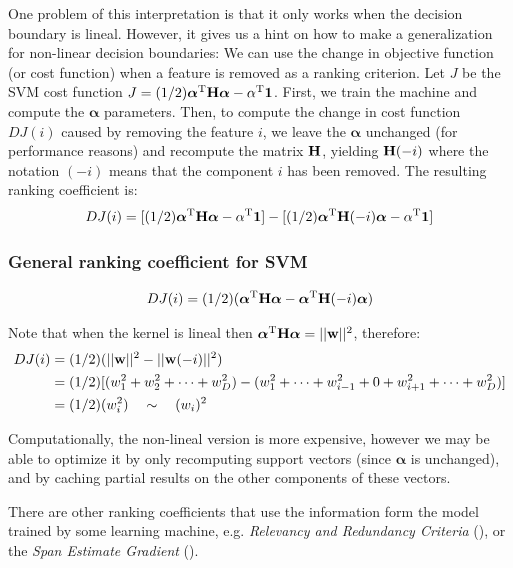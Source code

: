 One problem of this interpretation is that it only works when the decision bound\-ary is lineal. However, it gives us a hint on how to make a generalization for non-linear decision boundaries: We can use the change in objective function (or cost function) when a feature is removed as a ranking criterion. Let $J$ be the SVM cost function $J = (1/2) \boldsymbol{\alpha}^{\text{T}} \mathbf{H} \boldsymbol{\alpha} - \alpha^{\text{T}} \mathbf{1}$. First, we train the machine and compute the $\boldsymbol{\alpha}$ parameters. Then, to compute the change in cost function $DJ(i)$ caused by removing the feature $i$, we leave the $\boldsymbol{\alpha}$ unchanged (for performance reasons) and recompute the matrix $\mathbf{H}$, yielding $\mathbf{H}(-i)$ where the notation $(-i)$ means that the component $i$ has been removed. The resulting ranking coefficient is:
\begin{align*}
    DJ(i) = [(1/2) \boldsymbol{\alpha}^{\text{T}} \mathbf{H} \boldsymbol{\alpha} - \alpha^{\text{T}} \mathbf{1}]
     - [(1/2) \boldsymbol{\alpha}^{\text{T}} \mathbf{H}(-i) \boldsymbol{\alpha} - \alpha^{\text{T}} \mathbf{1}]
\end{align*}

\subsubsection*{General ranking coefficient for SVM}
\label{eq:ch4.grankingcoeff}
\begin{align}
    DJ(i) = (1/2)(\boldsymbol{\alpha}^{\text{T}} \mathbf{H} \boldsymbol{\alpha} - \boldsymbol{\alpha}^{\text{T}} \mathbf{H}(-i) \boldsymbol{\alpha})
\end{align}

Note that when the kernel is lineal then $\boldsymbol{\alpha}^{\text{T}} \mathbf{H} \boldsymbol{\alpha} = ||\mathbf{w}||^2$, therefore:
\begin{align*}
    DJ(i) &= (1/2)(||\mathbf{w}||^2 - ||\mathbf{w}(-i)||^2) \\
          &= (1/2)[(w_1^2 + w_2^2 + \dots + w_D^2) - (w_1^2 + \dots + w_{i-1}^2 + 0 + w_{i+1}^2 + \dots + w_D^2)] \\
          &= (1/2)(w_i^2) \quad \sim \quad (w_i)^2
\end{align*} 

Computationally, the non-lineal version is more expensive, however we may be able to optimize it by only recomputing support vectors (since $\boldsymbol{\alpha}$ is unchanged), and by caching partial results on the other components of these vectors.

\begin{sloppypar}
There are other ranking coefficients that use the information form the model trained by some learning machine, e.g. \emph{Relevancy and Redundancy Criteria} (\cite{mundra_svm-rfe_2007}), or the \emph{Span Estimate Gradient} (\cite{rakotomamonjy_variable_2003}).
\end{sloppypar}

